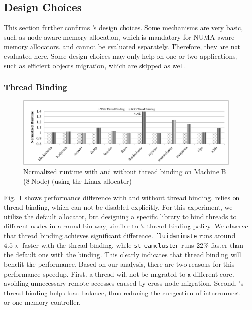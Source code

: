 \subsection{Design Choices}
\label{sec:design}

This section further confirms \NM{}'s design choices. Some mechanisms are very basic, such as node-aware memory allocation, which is mandatory for NUMA-aware memory allocators, and cannot be evaluated separately. Therefore, they are not evaluated here. Some design choices may only help on one or two applications, such as efficient objects migration, which are skipped as well.  

\subsubsection{Thread Binding}
\label{sec: threadbinding}

\begin{figure}[!h]
    \centering
    \includegraphics[width=\textwidth]{figure/WO-pthread-binding.pdf}
    \caption{Normalized runtime with and without thread binding on Machine B (8-Node) (using the Linux allocator)}
    \label{binding-pthread-scalibity}
\end{figure}

Fig.~\ref{binding-pthread-scalibity} shows performance difference with and without thread binding. \NM{} relies on thread binding, which can not be disabled explicitly. For this experiment, we utilize the default allocator, but designing a specific library to bind threads to different nodes in a round-bin way, similar to \NM{}'s thread binding policy. We observe that thread binding achieves significant difference. \texttt{fluidanimate} runs around $4.5\times$ faster with the thread binding, while  \texttt{streamcluster} runs 22\% faster than the default one with the binding. This clearly indicates that thread binding will benefit the performance. Based on our analysis, there are two reasons for this performance speedup. First, a thread will not be migrated to a different core, avoiding unnecessary remote accesses caused by cross-node migration. Second, \NM{}'s thread binding helps load balance, thus reducing  the congestion of interconnect or one memory controller.


